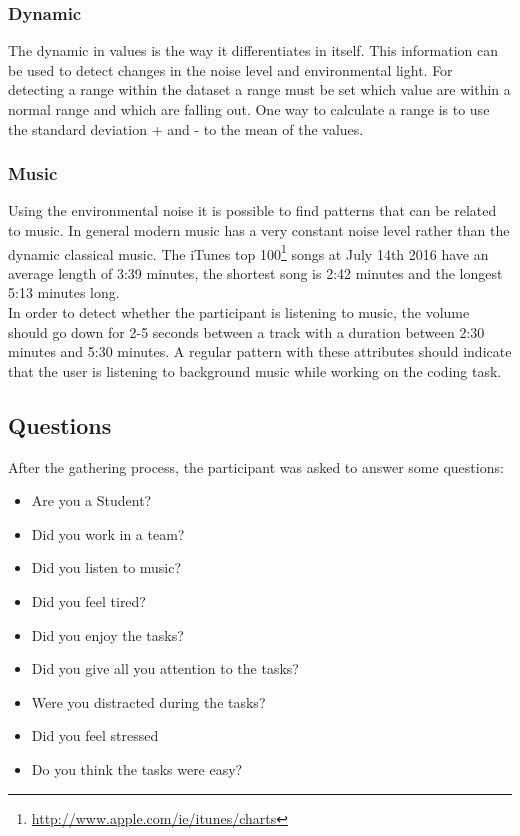 {\subsubsection{Dynamic}
The dynamic in values is the way it differentiates in itself. This information can be used to detect changes in the noise level and environmental light. For detecting a range within the dataset a range must be set which value are within a normal range and which are falling out. One way to calculate a range is to use the standard deviation + and - to the mean of the values. 

\subsubsection{Music}
Using the environmental noise it is possible to find patterns that can be related to music. In general modern music has a very constant noise level rather than the dynamic classical music. The iTunes top 100\footnote{\url{http://www.apple.com/ie/itunes/charts}} songs at July 14th 2016 have an average length of 3:39 minutes, the shortest song is 2:42 minutes and the longest 5:13 minutes long.\\
In order to detect whether the participant is listening to music, the volume should go down for 2-5 seconds between a track with a duration between 2:30 minutes and 5:30 minutes. 
A regular pattern with these attributes should indicate that the user is listening to background music while working on the coding task.

\subsection{Questions}
After the gathering process, the participant was asked to answer some questions:
\begin{itemize}
\item Are you a Student?
\item Did you work in a team?
\item Did you listen to music?
\item Did you feel tired?
\item Did you enjoy the tasks?
\item Did you give all you attention to the tasks?
\item Were you distracted during the tasks?
\item Did you feel stressed
\item Do you think the tasks were easy?
\end{itemize}

}
